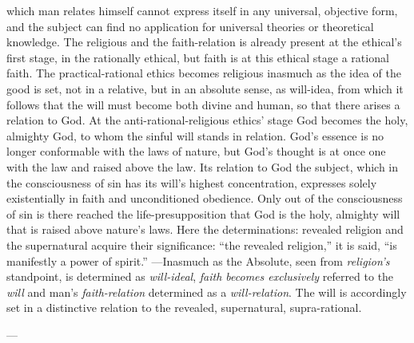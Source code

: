 \documentclass[12pt,a4paper]{book}
\begin{document}
which man relates himself cannot express itself in any universal, objective form, and the subject can
find no application for universal theories or theoretical knowledge. The religious and the
faith-relation is already present at the ethical's first stage, in the rationally ethical, but faith
is at this ethical stage a rational faith. The practical-rational ethics becomes religious inasmuch as
the idea of the good is set, not in a relative, but in an absolute sense, as will-idea, from which it
follows that the will must become both divine and human, so that there arises a relation to God. At
the anti-rational-religious ethics' stage God becomes the holy, almighty God, to whom the sinful will
stands in relation. God's essence is no longer conformable with the laws of nature, but God's thought
is at once one with the law and raised above the law. Its relation to God the subject, which in the
consciousness of sin has its will's highest concentration, expresses solely existentially in faith and
unconditioned obedience. Only out of the consciousness of sin is there reached the life-presupposition
that God is the holy, almighty will that is raised above nature's laws. Here the determinations:
revealed religion and the supernatural acquire their significance: ``the revealed religion,'' it
is said, ``is manifestly a power of spirit.'' ---Inasmuch as the Absolute, seen from \emph{religion's}
standpoint, is determined as \emph{will-ideal}, \emph{faith becomes exclusively} referred to the \emph{will}
and man's \emph{faith-relation} determined as a \emph{will-relation}. The will is accordingly set in a
distinctive relation to the revealed, supernatural, supra-rational.

\begin{center}---\end{center}
\end{document}
